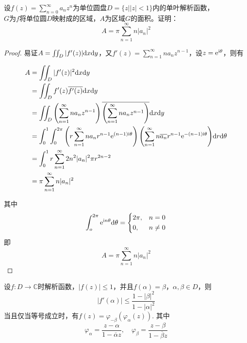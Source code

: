 \begin{proposition}
    
    设$f(z) = \sum\limits_{n = 0}^{\infty}{a_nz^n}$为单位圆盘$D = \{z\big| |z| < 1\}$内的单叶解析函数，\\
    $G$为$f$将单位圆$D$映射成的区域，$A$为区域$G$的面积。证明：
    $$A =  \pi\sum\limits_{n = 1}^{\infty}{n|a_n|^2}$$

\end{proposition}

\begin{proof}
    
    易证$A = \iint_{D}{|f'(z)|}\mathrm{d} x\mathrm{d} y$，又$f'(z) = \sum\limits_{n = 1}^{\infty}{na_nz^{n - 1}}$，设$z = \mathrm{e}^{\mathrm{i}\theta}$，则有

    \begin{align*}
        A & = \iint_{D}{|f'(z)|^2}\mathrm{d} x\mathrm{d} y \\ 
          & = \iint_{D}{f'(z)\overline{{f'(z)}}}\mathrm{d} x\mathrm{d} y \\
          & = \iint_{D}{\left( \sum\limits_{n = 1}^{\infty}{na_nz^{n - 1}} \right)\overline{\left( \sum\limits_{n = 1}^{\infty}{na_nz^{n - 1}} \right)}}\mathrm{d} x\mathrm{d} y \\
          & = \int_{0}^{1}{\int_{0}^{2 \pi}{\left( r\sum\limits_{n = 1}^{\infty}{na_nr^{n - 1}\mathrm{e}^{(n - 1)\mathrm{i}\theta}} \right)\left( \sum\limits_{n = 1}^{\infty}{n\overline{a_n}r^{n - 1}\mathrm{e}^{-(n - 1)\mathrm{i}\theta}} \right)}\mathrm{d} r}\mathrm{d} \theta \\
          & = \int_{0}^{1}{r\sum\limits_{n = 1}^{\infty}{2n^2|a_n|^2 \pi r^{2n - 2}}} \\
          & = \pi \sum\limits_{n = 1}^{\infty}{n|a_n|^2}
    \end{align*}

    其中
    $$
    \int_{o}^{2\pi}{\mathrm{e}^{\mathrm{i} n\theta}}\mathrm{d} \theta = 
    \left\{
        \begin{aligned}
            &2\pi, & n = 0 \\
            &0, & n \neq 0 \\
        \end{aligned}
    \right.
    $$
    即
    $$A = \pi \sum\limits_{n = 1}^{\infty}{n|a_n|^2}$$

\end{proof}

\begin{proposition}

    设$f:D \to \mathbb{C}$时解析函数，$|f(z)| \leq 1$，并且$f(\alpha) = \beta$，$\alpha, \beta \in D$，则
    $$|f'(\alpha)| \leq \dfrac{1 - |\beta|^2}{1 - |\alpha|^2}$$
    当且仅当等号成立时，有$f(z) = \varphi_{-\beta}(\varphi_{\alpha}(z))$. 其中
    $$\varphi_{\alpha} = \dfrac{z - \alpha}{1 - \overline{\alpha}{z}}, \quad \varphi_{\beta} = \dfrac{z - \beta}{1 - \overline{\beta}{z}}$$

\end{proposition}

